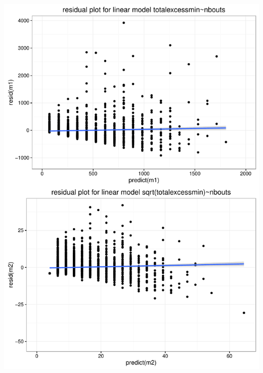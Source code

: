 \documentclass[11pt]{article}\usepackage[]{graphicx}\usepackage[]{color}
\makeatletter
\def\maxwidth{ %
  \ifdim\Gin@nat@width>\linewidth
    \linewidth
  \else
    \Gin@nat@width
  \fi
}
\newenvironment{knitrout}{}{} %
\makeatother
\begin{document}
\begin{knitrout}
\color{fgcolor}
\includegraphics[width=\maxwidth]{figure/resid-1} 

\end{knitrout}
\end{document}
